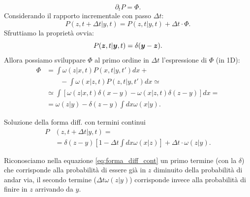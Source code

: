 \begin{exmp}[$A=B=0$, quindi $\Gamma =0$]
    \[
        \partial_{t}P = \Phi
    .\] 
    Considerando il rapporto incrementale con passo $\Delta t$:
    \[
	P(z, t+\Delta t|y, t) = P(z,t|y,t) + \Delta t\cdot  \Phi
    .\] 
    Sfruttiamo la proprietà ovvia:
    \[
	P(\boldsymbol{z}, t|\boldsymbol{y}, t) = \delta (\boldsymbol{y}-\boldsymbol{z}) 
    .\] 
    Allora possiamo sviluppare $\Phi$ al primo ordine in $\Delta t$ l'espressione di $\Phi$ (in 1D):
    \[\begin{aligned}
	\Phi &= \int \omega (z|x, t) P(x,t|y,t') dx +\\
          & \qquad  - \int \omega (x|z, t) P(z,t|y,t') dx \simeq \\
	     & \simeq \int\left[\omega (z|x, t) \delta (x-y) - \omega (x|z, t)\delta (z-y) \right]dx = \\
	     & = \omega(z|y) - \delta(z-y) \int dx \omega(x|y)
    .\end{aligned}\]    
    \begin{greenbox}{Soluzione della forma diff. con termini continui}
    \begin{align}
	P&(z, t + \Delta t| y, t) = \nonumber \\
	&= \delta (z-y) \left[1-\Delta t\int dx \omega (x|z) \right] + \Delta t \cdot \omega (z|y) 
	\label{eq:forma_diff_cont}
    .\end{align}
    \end{greenbox}
    \noindent
    Riconosciamo nella equazione \ref{eq:forma_diff_cont} un primo termine (con la $\delta$) che corrisponde alla probabilità di essere già in $z$ diminuito della probabilità di andar via, il secondo termine ($\Delta t \omega (z|y)$) corrisponde invece alla probabilità di finire in $z$ arrivando da $y$.
    \noindent
\end{exmp}
\noindent

\clearpage
